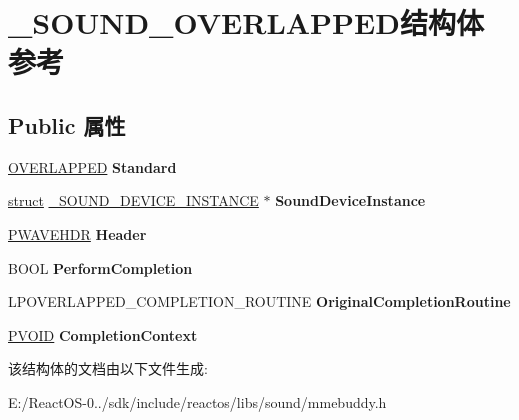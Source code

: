\hypertarget{struct___s_o_u_n_d___o_v_e_r_l_a_p_p_e_d}{}\section{\+\_\+\+S\+O\+U\+N\+D\+\_\+\+O\+V\+E\+R\+L\+A\+P\+P\+E\+D结构体 参考}
\label{struct___s_o_u_n_d___o_v_e_r_l_a_p_p_e_d}
\subsection*{Public 属性}
\begin{DoxyCompactItemize}
\item 
\mbox{\label{struct___s_o_u_n_d___o_v_e_r_l_a_p_p_e_d_a1c0f772f48ec33a84ed966df579abfb8}} 
\hyperlink{struct___o_v_e_r_l_a_p_p_e_d}{O\+V\+E\+R\+L\+A\+P\+P\+ED} {\bfseries Standard}
\item 
\mbox{\label{struct___s_o_u_n_d___o_v_e_r_l_a_p_p_e_d_ac4f2ee4cc90a195407959b8ebd3d8514}} 
\hyperlink{interfacestruct}{struct} \hyperlink{struct___s_o_u_n_d___d_e_v_i_c_e___i_n_s_t_a_n_c_e}{\+\_\+\+S\+O\+U\+N\+D\+\_\+\+D\+E\+V\+I\+C\+E\+\_\+\+I\+N\+S\+T\+A\+N\+CE} $\ast$ {\bfseries Sound\+Device\+Instance}
\item 
\mbox{\label{struct___s_o_u_n_d___o_v_e_r_l_a_p_p_e_d_a41412621c5851c66c20a9e3981789253}} 
\hyperlink{structwavehdr__tag}{P\+W\+A\+V\+E\+H\+DR} {\bfseries Header}
\item 
\mbox{\label{struct___s_o_u_n_d___o_v_e_r_l_a_p_p_e_d_a2632446bc900dead76aeb3618365a6ee}} 
B\+O\+OL {\bfseries Perform\+Completion}
\item 
\mbox{\label{struct___s_o_u_n_d___o_v_e_r_l_a_p_p_e_d_adf2780550cee49c20e78b3f773ffc1d9}} 
L\+P\+O\+V\+E\+R\+L\+A\+P\+P\+E\+D\+\_\+\+C\+O\+M\+P\+L\+E\+T\+I\+O\+N\+\_\+\+R\+O\+U\+T\+I\+NE {\bfseries Original\+Completion\+Routine}
\item 
\mbox{\label{struct___s_o_u_n_d___o_v_e_r_l_a_p_p_e_d_a797c9901f31893c82b2512f984a09d05}} 
\hyperlink{interfacevoid}{P\+V\+O\+ID} {\bfseries Completion\+Context}
\end{DoxyCompactItemize}


该结构体的文档由以下文件生成\+:\begin{DoxyCompactItemize}
\item 
E\+:/\+React\+O\+S-\/0../sdk/include/reactos/libs/sound/mmebuddy.\+h\end{DoxyCompactItemize}
